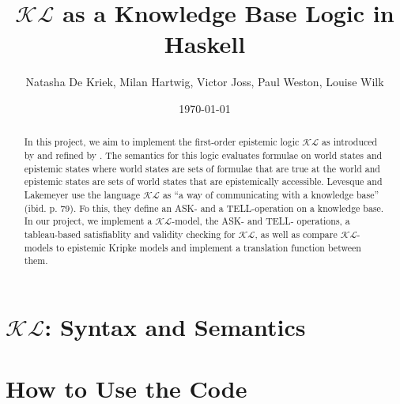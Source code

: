 \documentclass[12pt,a4paper]{article}
\title{$\mathcal{KL}$ as a Knowledge Base Logic in Haskell}
\author{Natasha De Kriek, Milan Hartwig, Victor Joss, Paul Weston, Louise Wilk}
\date{\today}
\begin{document}
\maketitle

\begin{abstract}
In this project, we aim to implement the first-order epistemic logic $\mathcal{KL}$ as introduced by \textcite{levesque1981} and refined by \textcite{Lokb}. 
The semantics for this logic evaluates formulae on world states and epistemic states where world states are sets of formulae that are true at the world and epistemic states are sets of world states that are epistemically accessible. Levesque and Lakemeyer use the language $\mathcal{KL}$ as “a way of communicating with a knowledge base” (ibid. p. 79). Fo this, they define an ASK- and a TELL-operation on a knowledge base. In our project, we implement a  $\mathcal{KL}$-model, the ASK- and TELL- operations, a tableau-based satisfiablity and validity checking for  $\mathcal{KL}$, as well as compare  $\mathcal{KL}$-models to epistemic Kripke models and implement a translation function between them.
\end{abstract}


\tableofcontents

\clearpage


%


\section{\texorpdfstring{$\mathcal{KL}$}{KL}: Syntax and Semantics}\label{sec:KLmodel}








%
%








% 

\section{How to Use the Code}
\end{document}
